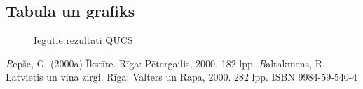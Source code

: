 \documentclass{report}
\begin{document}
    \subsection{Tabula un grafiks}
    \begin{figure}[h]
        \centering
        \caption{Iegūtie rezultāti QUCS}
        \label{fig:my_label5}
    \end{figure}
\begin{thebibliography}{9}
\textit Repše, G. (2000a) Īkstīte. Rīga: Pētergailis, 2000. 182 lpp.
\textit
Baltakmens, R. Latvietis un viņa zirgi. Rīga: Valters un Rapa, 2000. 282 lpp. ISBN 9984-59-540-4 



\end{thebibliography}
\end{document}
